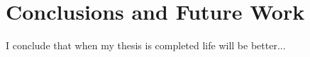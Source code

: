 \chapter{Conclusions and Future Work}

I conclude that when my thesis is completed life will be better...